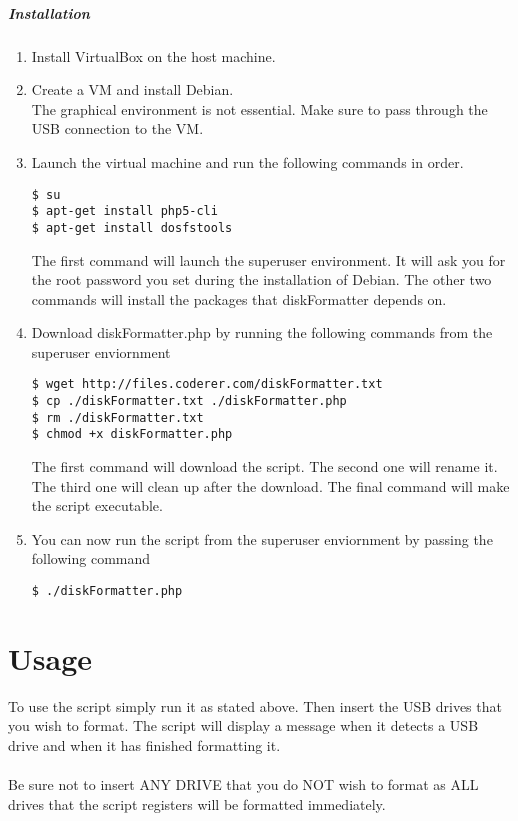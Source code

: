\documentclass{article}
\begin{document}
\subparagraph{Installation}
\begin{enumerate}
\item Install VirtualBox on the host machine.
\item Create a VM and install Debian. \\ The graphical environment is not essential. Make sure to pass through the USB connection to the VM.
\item Launch the virtual machine and run the following commands in order. \begin{verbatim}$ su
$ apt-get install php5-cli 
$ apt-get install dosfstools\end{verbatim}
The first command will launch the superuser environment. It will ask you for the root password you set during the installation of Debian. The other two commands will install the packages that diskFormatter depends on.
\item Download diskFormatter.php by running the following commands from the superuser enviornment \begin{verbatim}$ wget http://files.coderer.com/diskFormatter.txt
$ cp ./diskFormatter.txt ./diskFormatter.php
$ rm ./diskFormatter.txt
$ chmod +x diskFormatter.php\end{verbatim}
The first command will download the script. The second one will rename it. The third one will clean up after the download. The final command will make the script executable.
\item You can now run the script from the superuser enviornment by passing the following command\begin{verbatim}$ ./diskFormatter.php\end{verbatim} 
\end{enumerate}

\section{Usage}
To use the script simply run it as stated above. Then insert the USB drives that you wish to format. The script will display a message when it detects a USB drive and when it has finished formatting it.\\ \\Be sure not to insert ANY DRIVE that you do NOT wish to format as ALL drives that the script registers will be formatted immediately.
\end{document}
